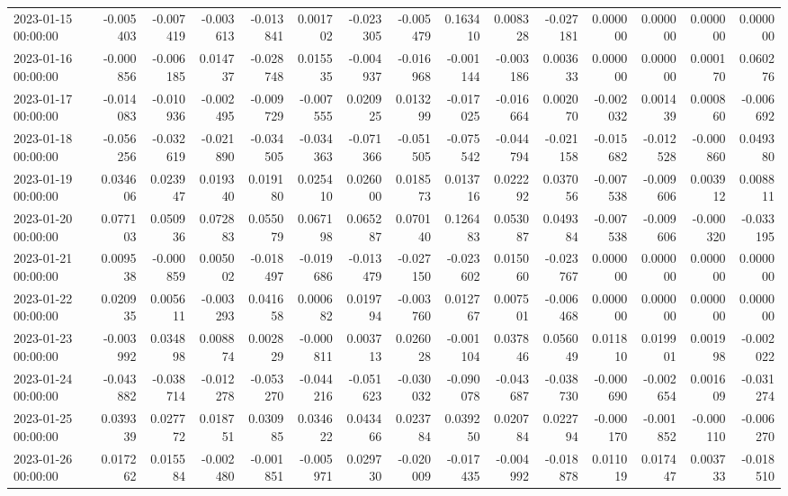 \begin{tabular}{lrrrrrrrrrrrrrr}
2023-01-15 00:00:00 & -0.005403 & -0.007419 & -0.003613 & -0.013841 & 0.001702 & -0.023305 & -0.005479 & 0.163410 & 0.008328 & -0.027181 & 0.000000 & 0.000000 & 0.000000 & 0.000000 \\
2023-01-16 00:00:00 & -0.000856 & -0.006185 & 0.014737 & -0.028748 & 0.015535 & -0.004937 & -0.016968 & -0.001144 & -0.003186 & 0.003633 & 0.000000 & 0.000000 & 0.000170 & 0.060276 \\
2023-01-17 00:00:00 & -0.014083 & -0.010936 & -0.002495 & -0.009729 & -0.007555 & 0.020925 & 0.013299 & -0.017025 & -0.016664 & 0.002070 & -0.002032 & 0.001439 & 0.000860 & -0.006692 \\
2023-01-18 00:00:00 & -0.056256 & -0.032619 & -0.021890 & -0.034505 & -0.034363 & -0.071366 & -0.051505 & -0.075542 & -0.044794 & -0.021158 & -0.015682 & -0.012528 & -0.000860 & 0.049380 \\
2023-01-19 00:00:00 & 0.034606 & 0.023947 & 0.019340 & 0.019180 & 0.025410 & 0.026000 & 0.018573 & 0.013716 & 0.022292 & 0.037056 & -0.007538 & -0.009606 & 0.003912 & 0.008811 \\
2023-01-20 00:00:00 & 0.077103 & 0.050936 & 0.072883 & 0.055079 & 0.067198 & 0.065287 & 0.070140 & 0.126483 & 0.053087 & 0.049384 & -0.007538 & -0.009606 & -0.000320 & -0.033195 \\
2023-01-21 00:00:00 & 0.009538 & -0.000859 & 0.005002 & -0.018497 & -0.019686 & -0.013479 & -0.027150 & -0.023602 & 0.015060 & -0.023767 & 0.000000 & 0.000000 & 0.000000 & 0.000000 \\
2023-01-22 00:00:00 & 0.020935 & 0.005611 & -0.003293 & 0.041658 & 0.000682 & 0.019794 & -0.003760 & 0.012767 & 0.007501 & -0.006468 & 0.000000 & 0.000000 & 0.000000 & 0.000000 \\
2023-01-23 00:00:00 & -0.003992 & 0.034898 & 0.008874 & 0.002829 & -0.000811 & 0.003713 & 0.026028 & -0.001104 & 0.037846 & 0.056049 & 0.011810 & 0.019901 & 0.001998 & -0.002022 \\
2023-01-24 00:00:00 & -0.043882 & -0.038714 & -0.012278 & -0.053270 & -0.044216 & -0.051623 & -0.030032 & -0.090078 & -0.043687 & -0.038730 & -0.000690 & -0.002654 & 0.001609 & -0.031274 \\
2023-01-25 00:00:00 & 0.039339 & 0.027772 & 0.018751 & 0.030985 & 0.034622 & 0.043466 & 0.023784 & 0.039250 & 0.020784 & 0.022794 & -0.000170 & -0.001852 & -0.000110 & -0.006270 \\
2023-01-26 00:00:00 & 0.017262 & 0.015584 & -0.002480 & -0.001851 & -0.005971 & 0.029730 & -0.020009 & -0.017435 & -0.004992 & -0.018878 & 0.011019 & 0.017447 & 0.003733 & -0.018510 \\

\end{tabular}
